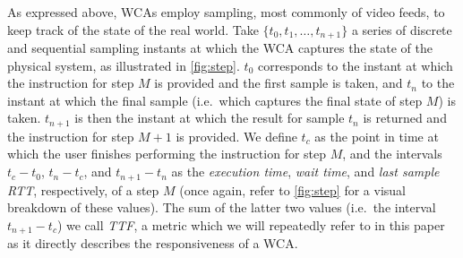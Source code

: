 As expressed above, \acp{WCA} employ sampling, most commonly of video feeds, to keep track of the state of the real world.
Take \( \{ t_0, t_1, \ldots, t_{n + 1} \} \) a series of discrete and sequential sampling instants at which the \ac{WCA} captures the state of the physical system, as illustrated in \cref{fig:step}.
\( t_0 \) corresponds to the instant at which the instruction for step \( M \) is provided and the first sample is taken, and \( t_n \) to the instant at which the final sample (i.e.\ which captures the final state of step \( M \)) is taken. 
\( t_{n + 1} \) is then the instant at which the result for sample \( t_n \) is returned and the instruction for step \( M + 1 \) is provided.
We define \( t_c \) as the point in time at which the user finishes performing the instruction for step \( M \), and the intervals \( t_c - t_0 \), \( t_n - t_c \), and \( t_{n + 1} - t_n \) as the \emph{execution time}, \emph{wait time}, and \emph{last sample \ac{RTT}}, respectively, of a step \( M \) (once again, refer to \cref{fig:step} for a visual breakdown of these values).
The sum of the latter two values (i.e.\ the interval \( t_{n + 1} - t_c \)) we call \emph{\ac{TTF}}, a metric which we will repeatedly refer to in this paper as it directly describes the responsiveness of a \ac{WCA}.



